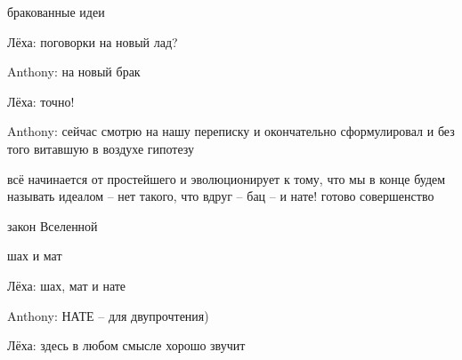 \begin{miamalist}
  бракованные идеи
  \item[Лёха:] поговорки на новый лад?
  \item[Anthony:] на новый брак
  \item[Лёха:] точно!
  \item[Anthony:] сейчас смотрю на нашу переписку и окончательно сформулировал и без того витавшую в воздухе гипотезу

  всё начинается от простейшего и эволюционирует к тому, что мы в конце будем называть идеалом -- нет такого, что вдруг -- бац -- и нате! готово совершенство

  закон Вселенной

  шах и мат
  \item[Лёха:] шах, мат и нате
  \item[Anthony:] НАТЕ -- для двупрочтения)
  \item[Лёха:] здесь в любом смысле хорошо звучит
\end{miamalist}








